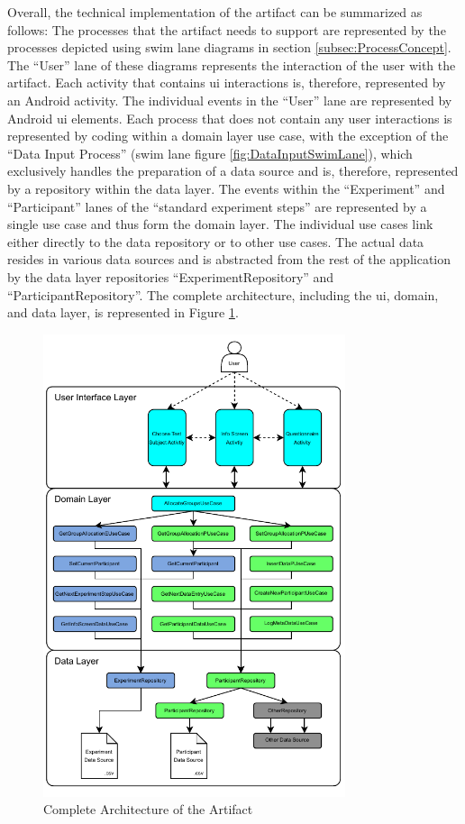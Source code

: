 Overall, the technical implementation of the artifact can be summarized as follows: The processes that the artifact needs to support are represented by the processes depicted using swim lane diagrams in section \ref{subsec:ProcessConcept}. The \enquote{User} lane of these diagrams represents the interaction of the user with the artifact. Each activity that contains \ac{ui} interactions is, therefore, represented by an Android activity. The individual events in the \enquote{User} lane are represented by Android \ac{ui} elements. Each process that does not contain any user interactions is represented by coding within a domain layer use case, with the exception of the \enquote{Data Input Process} (swim lane figure \ref{fig:DataInputSwimLane}), which exclusively handles the preparation of a data source and is, therefore, represented by a repository within the data layer. The events within the \enquote{Experiment} and \enquote{Participant} lanes of the \enquote{standard experiment steps} are represented by a single use case and thus form the domain layer. The individual use cases link either directly to the data repository or to other use cases. The actual data resides in various data sources and is abstracted from the rest of the application by the data layer repositories \enquote{ExperimentRepository} and \enquote{ParticipantRepository}. The complete architecture, including the \ac{ui}, domain, and data layer, is represented in Figure \ref{fig:completeArchitecture}.


\begin{figure}[htbp]
    \centering
    \includegraphics[width=0.79\textwidth, keepaspectratio]{content/05_design_and_dev_artefacts/Complete Architecture.drawio.pdf}
    \caption{Complete Architecture of the Artifact}    
    \label{fig:completeArchitecture}
\end{figure}